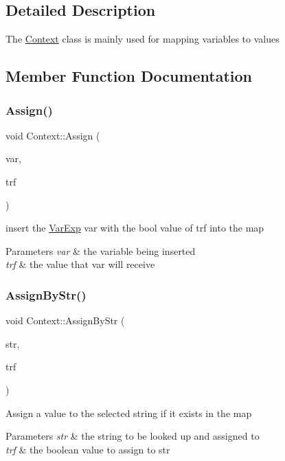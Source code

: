 \subsection{Detailed Description}
The \mbox{\hyperlink{classContext}{Context}} class is mainly used for mapping variables to values 

\subsection{Member Function Documentation}
\mbox{\label{classContext_a223eb7768e091ed328ac50cd7955a198}} 
\subsubsection{\texorpdfstring{Assign()}{Assign()}}
{\footnotesize\ttfamily void Context\+::\+Assign (\begin{DoxyParamCaption}\item[{shared\+\_\+ptr$<$ \mbox{\hyperlink{classVarExp}{Var\+Exp}} $>$}]{var,  }\item[{bool}]{trf }\end{DoxyParamCaption})}

insert the \mbox{\hyperlink{classVarExp}{Var\+Exp}} var with the bool value of trf into the map 
\begin{DoxyParams}{Parameters}
{\em var} & the variable being inserted \\
\hline
{\em trf} & the value that var will receive \\
\hline
\end{DoxyParams}
\mbox{\label{classContext_aa7bdd4c9b4aa512ac7d08dd58f5e13c0}} 
\subsubsection{\texorpdfstring{Assign\+By\+Str()}{AssignByStr()}}
{\footnotesize\ttfamily void Context\+::\+Assign\+By\+Str (\begin{DoxyParamCaption}\item[{string}]{str,  }\item[{bool}]{trf }\end{DoxyParamCaption})}

Assign a value to the selected string if it exists in the map 
\begin{DoxyParams}{Parameters}
{\em str} & the string to be looked up and assigned to \\
\hline
{\em trf} & the boolean value to assign to str \\
\hline
\end{DoxyParams}
\mbox{\label{classContext_abec0d3806d24c62690deb56803a70712}} 
